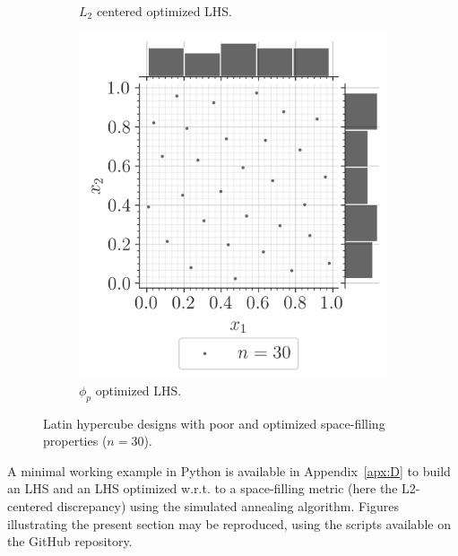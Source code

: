 \begin{figure}[ht]
\begin{subfigure}[b]{0.32\textwidth}
        \caption{$L_2$ centered optimized LHS.}
    \end{subfigure}
    \hfill
    \begin{subfigure}[b]{0.32\textwidth}
        \centering
        \includegraphics[width=\textwidth]{../numerical_experiments/chapter1/figures/optimized_phip_LHS.png}
        \caption{$\phi_p$ optimized LHS.}
    \end{subfigure}
       \caption{Latin hypercube designs with poor and optimized space-filling properties ($n=30$).}
       \label{fig:LHS_designs}
\end{figure}


\begin{otexample}
    A minimal working example in Python is available in Appendix~\ref{apx:D} to build an LHS and 
    an LHS optimized w.r.t. to a space-filling metric (here the L2-centered discrepancy) using the simulated annealing algorithm. 
    Figures illustrating the present section may be reproduced, using the \ots scripts available on the GitHub repository\footnotemark.  
\end{otexample}

